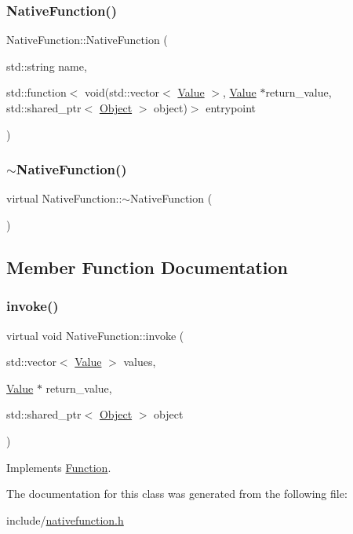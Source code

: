 \subsubsection{\texorpdfstring{Native\+Function()}{NativeFunction()}}
{\footnotesize\ttfamily Native\+Function\+::\+Native\+Function (\begin{DoxyParamCaption}\item[{std\+::string}]{name,  }\item[{std\+::function$<$ void(std\+::vector$<$ \hyperlink{classValue}{Value} $>$, \hyperlink{classValue}{Value} $\ast$return\+\_\+value, std\+::shared\+\_\+ptr$<$ \hyperlink{classObject}{Object} $>$ object)$>$}]{entrypoint }\end{DoxyParamCaption})}

\mbox{\label{classNativeFunction_aa6055c6a092b8be8d1f9009efc6db0e0}} 
\subsubsection{\texorpdfstring{$\sim$\+Native\+Function()}{~NativeFunction()}}
{\footnotesize\ttfamily virtual Native\+Function\+::$\sim$\+Native\+Function (\begin{DoxyParamCaption}{ }\end{DoxyParamCaption})\hspace{0.3cm}{\ttfamily [virtual]}}



\subsection{Member Function Documentation}
\mbox{\label{classNativeFunction_a0f003d805cbc3625e311d1b2a1b861d9}} 
\subsubsection{\texorpdfstring{invoke()}{invoke()}}
{\footnotesize\ttfamily virtual void Native\+Function\+::invoke (\begin{DoxyParamCaption}\item[{std\+::vector$<$ \hyperlink{classValue}{Value} $>$}]{values,  }\item[{\hyperlink{classValue}{Value} $\ast$}]{return\+\_\+value,  }\item[{std\+::shared\+\_\+ptr$<$ \hyperlink{classObject}{Object} $>$}]{object }\end{DoxyParamCaption})\hspace{0.3cm}{\ttfamily [virtual]}}



Implements \hyperlink{classFunction_a84f9a63e68becc27e58ea738ba4cd698}{Function}.



The documentation for this class was generated from the following file\+:\begin{DoxyCompactItemize}
\item 
include/\hyperlink{nativefunction_8h}{nativefunction.\+h}\end{DoxyCompactItemize}
